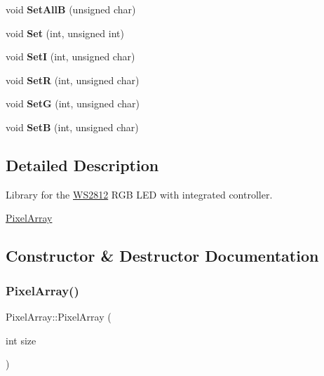 \begin{DoxyCompactItemize}
void {\bfseries Set\+AllB} (unsigned char)
\item 
\mbox{\label{class_pixel_array_afcfe32b74beeced27f928f42131d77c1}} 
void {\bfseries Set} (int, unsigned int)
\item 
\mbox{\label{class_pixel_array_afbfac74c674f63d793d85141d3a3b046}} 
void {\bfseries SetI} (int, unsigned char)
\item 
\mbox{\label{class_pixel_array_abd4253e7c76f3775f31e09dfe318e3a5}} 
void {\bfseries SetR} (int, unsigned char)
\item 
\mbox{\label{class_pixel_array_a60ea8084ec95df0d51f46c9b0ff308d5}} 
void {\bfseries SetG} (int, unsigned char)
\item 
\mbox{\label{class_pixel_array_a560a654c59614fd5a6c17adb10083a78}} 
void {\bfseries SetB} (int, unsigned char)
\end{DoxyCompactItemize}


\subsection{Detailed Description}
Library for the \hyperlink{class_w_s2812}{W\+S2812} R\+GB L\+ED with integrated controller. 

\hyperlink{class_pixel_array}{Pixel\+Array} 

\subsection{Constructor \& Destructor Documentation}
\mbox{\label{class_pixel_array_a86359f5eda90e0d12e3aa2c102ade21d}} 
\subsubsection{\texorpdfstring{Pixel\+Array()}{PixelArray()}}
{\footnotesize\ttfamily Pixel\+Array\+::\+Pixel\+Array (\begin{DoxyParamCaption}\item[{int}]{size }\end{DoxyParamCaption})}



